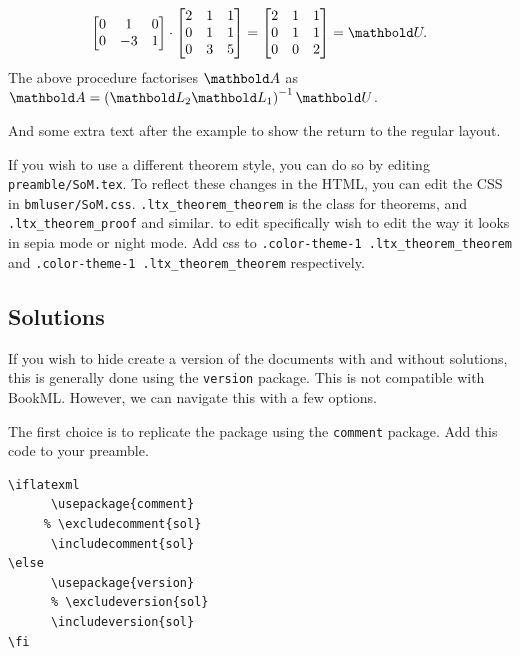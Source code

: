 \begin{example}
\[\begin{bmatrix}
            0	&	1		&	0	\\
            0	&	-3	&	1	\\
        \end{bmatrix}
        \cdot
        \begin{bmatrix}
            2	&	1	&	1	\\
            0	&	1	&	1	\\
            0	&	3	&	5	\\
        \end{bmatrix}
        =
        \begin{bmatrix}
            2	&	1	&	1	\\
            0	&	1	&	1	\\
            0	&	0	&	2	\\
        \end{bmatrix}
        = \mat{U}.
    \]
    The above procedure factorises $\mat{A}$ as $\mat{A} = \left( \mat{L}_2\mat{L}_1 \right)^{-1}\mat{U}$.
\end{example}

And some extra text after the example to show the return to the regular layout.

If you wish to use a different theorem style, you can do so by editing \texttt{preamble/SoM.tex}. To reflect these changes in the HTML, you can edit the CSS in \texttt{bmluser/SoM.css}. \verb|.ltx_theorem_theorem| is the class for theorems, and \verb|.ltx_theorem_proof| and similar. to edit specifically wish to edit the way it looks in sepia mode or night mode. Add css to \verb|.color-theme-1 .ltx_theorem_theorem| and \verb|.color-theme-1 .ltx_theorem_theorem| respectively.

\subsection{Solutions}

If you wish to hide create a version of the documents with and without solutions, this is generally done using the \texttt{version} package. This is not compatible with BookML. However, we can navigate this with a few options. 

The first choice is to replicate the package using the \texttt{comment} package. Add this code to your preamble. 

\begin{lstlisting}
\iflatexml 
      \usepackage{comment} 
     % \excludecomment{sol} 
      \includecomment{sol} 
\else 
      \usepackage{version} 
      % \excludeversion{sol} 
      \includeversion{sol} 
\fi 
\end{lstlisting}

